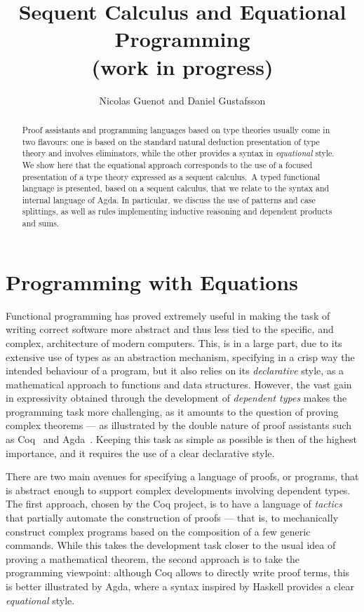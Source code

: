 \documentclass[creativecommons]{eptcs/eptcs}
\title{Sequent Calculus and Equational Programming \\
  {\rm \normalsize (work in progress)}}
\author{Nicolas Guenot and Daniel Gustafsson
\institute{IT University of Copenhagen}
\email{\{ngue,dagu\}@itu.dk}}
\begin{document}
\vlnosmallleftlabels

\maketitle

\begin{abstract}
Proof assistants and programming languages based on type theories usually come
in two flavours: one is based on the standard natural deduction presentation
of type theory and involves eliminators, while the other provides a syntax in
\emph{equational} style. We show here that the equational approach corresponds
to the use of a focused presentation of a type theory expressed as a sequent
calculus.~A typed functional language is presented, based on a sequent calculus,
that we relate to the syntax and internal language of Agda. In particular, we
discuss the use of patterns and case splittings, as well as rules implementing
inductive reasoning and dependent products and sums.
\end{abstract}



\section{Programming with Equations}
\label{sec:progeq}

Functional programming has proved extremely useful in making the task of writing
correct software more abstract and thus less tied to the specific, and complex,
architecture of modern computers. This, is in a large part, due to its extensive
use of types as an abstraction mechanism, specifying in a crisp way the intended
behaviour of a program, but it also relies on its \emph{declarative} style, as
a mathematical approach to functions and data structures. However, the vast gain
in expressivity obtained through the development of \emph{dependent types} makes
the programming task more challenging, as it amounts to the question of proving
complex theorems --- as illustrated by the double nature of proof
assistants such as Coq~\cite{dowek:al:93:coq} and Agda~\cite{norell:phd}.
Keeping this task as simple as possible is then of the highest importance, and
it requires the use of a clear declarative style.

There are two main avenues for specifying a language of proofs, or programs,
that is abstract enough to support complex developments involving dependent
types. The first approach, chosen by the Coq project, is to have a language
of \emph{tactics} that partially automate the construction of proofs --- that
is, to mechanically construct complex programs based on the composition of a
few generic commands. While this takes the development task closer to the
usual idea of proving a mathematical theorem, the second approach is to take
the programming viewpoint: although Coq allows to directly write proof terms,
this is better illustrated by Agda, where a syntax inspired by Haskell
\cite{haskell:www} provides a clear \emph{equational} style.
\end{document}
